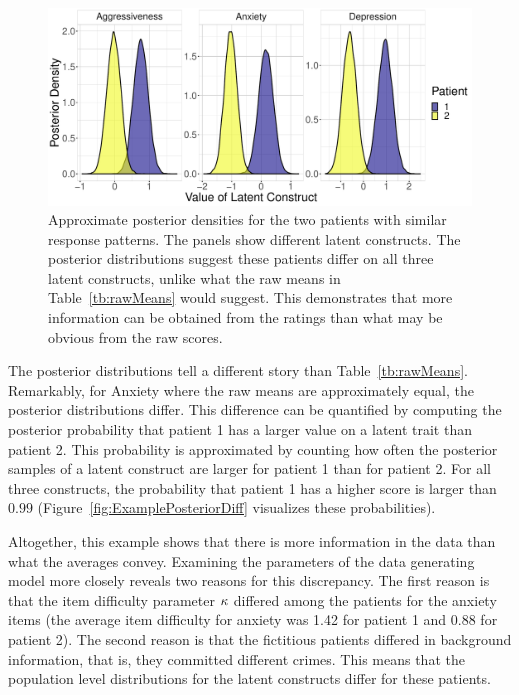 \documentclass[a4paper,usenames,dvipsnames]{article}
\begin{document}
\begin{figure}[!ht]
	\includegraphics[width=\textwidth]{figures/twoPatientsDensity.pdf}
	\caption{Approximate posterior densities for the two patients with similar response patterns. The panels show different latent constructs. The posterior distributions suggest these patients differ on all three latent constructs, unlike what the raw means in Table~\ref{tb:rawMeans} would suggest. This demonstrates that more information can be obtained from the ratings than what may be obvious from the raw scores.}
	\label{fig:ExamplePosterior}
\end{figure}
The posterior distributions tell a different story than Table~\ref{tb:rawMeans}. Remarkably, for Anxiety where the raw means are approximately equal, the posterior distributions differ. This difference can be quantified by computing the posterior probability that patient 1 has a larger value on a latent trait than patient 2. This probability is approximated by counting how often the posterior samples of a latent construct are larger for patient 1 than for patient 2. For all three constructs, the probability that patient 1 has a higher score is larger than $0.99$ (Figure~\ref{fig:ExamplePosteriorDiff} visualizes these probabilities).

Altogether, this example shows that there is more information in the data than what the averages convey. Examining the parameters of the data generating model more closely reveals two reasons for this discrepancy. The first reason is that the item difficulty parameter $\kappa$ differed among the patients for the anxiety items (the average item difficulty for anxiety was 1.42 for patient 1 and 0.88 for patient 2). The second reason is that the fictitious patients differed in background information, that is, they committed different crimes. This means that the population level distributions for the latent constructs differ for these patients.
\end{document}
